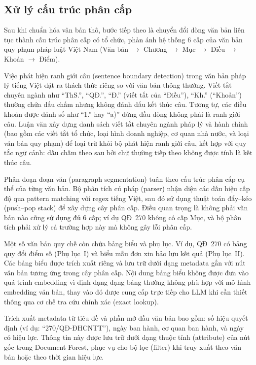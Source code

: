 \subsection{Xử lý cấu trúc phân cấp}
\label{subsec:xu-ly-cau-truc}

Sau khi chuẩn hóa văn bản thô, bước tiếp theo là chuyển đổi dòng văn bản liên
tục thành cấu trúc phân cấp có tổ chức, phản ánh hệ thống 6 cấp của văn bản
quy phạm pháp luật Việt Nam (Văn bản $\rightarrow$ Chương $\rightarrow$ Mục
$\rightarrow$ Điều $\rightarrow$ Khoản $\rightarrow$ Điểm).

Việc phát hiện ranh giới câu (sentence boundary detection) trong văn bản pháp lý
tiếng Việt đặt ra thách thức riêng so với văn bản thông thường. Viết tắt chuyên
ngành như ``ThS.'', ``QĐ.'', ``Đ.'' (viết tắt của ``Điều''), ``Kh.'' (``Khoản'')
thường chứa dấu chấm nhưng không đánh dấu kết thúc câu. Tương tự, các điều
khoản được đánh số như ``1.'' hay ``a)'' đứng đầu dòng không phải là ranh giới
câu. Luận văn xây dựng danh sách viết tắt chuyên ngành pháp lý và hành chính (bao gồm
các viết tắt tổ chức, loại hình doanh nghiệp, cơ quan nhà nước, và loại văn bản
quy phạm) để loại trừ khỏi bộ phát hiện ranh giới câu, kết hợp với quy tắc ngữ
cảnh: dấu chấm theo sau bởi chữ thường tiếp theo không được tính là kết thúc câu.

Phân đoạn đoạn văn (paragraph segmentation) tuân theo cấu trúc phân cấp cụ thể
của từng văn bản. Bộ phân tích cú pháp (parser) nhận diện các dấu hiệu cấp độ
qua pattern matching với regex tiếng Việt, sau đó sử dụng thuật toán đẩy--kéo
(push--pop stack) để xây dựng cây phân cấp. Điều quan trọng là không phải văn
bản nào cũng sử dụng đủ 6 cấp; ví dụ QĐ~270 không có cấp Mục, và bộ phân tích
phải xử lý cả trường hợp này mà không gây lỗi phân cấp.

Một số văn bản quy chế còn chứa bảng biểu và phụ lục. Ví dụ, QĐ~270 có bảng
quy đổi điểm số (Phụ lục~I) và biểu mẫu đơn xin bảo lưu kết quả (Phụ lục~II).
Các bảng biểu được trích xuất riêng và lưu trữ dưới dạng metadata gắn với nút
văn bản tương ứng trong cây phân cấp. Nội dung bảng biểu không được đưa vào quá
trình embedding vì định dạng dạng bảng thường không phù hợp với mô hình embedding
văn bản, thay vào đó được cung cấp trực tiếp cho LLM khi cần thiết thông qua
cơ chế tra cứu chính xác (exact lookup).

Trích xuất metadata từ tiêu đề và phần mở đầu văn bản bao gồm: số hiệu quyết
định (ví dụ: ``270/QĐ-ĐHCNTT''), ngày ban hành, cơ quan ban hành, và ngày có
hiệu lực. Thông tin này được lưu trữ dưới dạng thuộc tính (attribute) của nút
gốc trong Document Forest, phục vụ cho bộ lọc (filter) khi truy xuất theo văn
bản hoặc theo thời gian hiệu lực.


